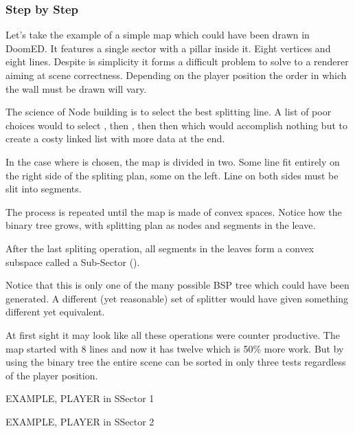 \subsubsection{Step by Step}
Let's take the example of a simple map which could have been drawn in DoomED. It features a single sector with a pillar inside it. Eight vertices and eight lines. Despite is simplicity it forms a difficult problem to solve to a renderer aiming at scene correctness. Depending on the player position the order in which the wall must be drawn will vary. \\
\par
{}
\par
The science of Node building is to select the best splitting line. A list of poor choices would to select , then , then  then  which would accomplish nothing but to create a costy linked list with more data at the end.\\ 
\par
In the case where  is chosen, the map is divided in two. Some line fit entirely on the right side of the spliting plan, some on the left. Line on both sides must be slit into segments.\\
\par
{}
\par
The process is repeated until the map is made of convex spaces. Notice how the binary tree grows, with splitting plan as nodes and segments in the leave. 
\par
{}
\par
After the last spliting operation, all segments in the leaves form a convex subspace called a Sub-Sector ().\\
\par
{}
\par
Notice that this is only one of the many possible BSP tree which could have been generated. A different (yet reasonable) set of splitter would have given something different yet equivalent.\\
\par
{}
\par
At first sight it may look like all these operations were counter productive. The map started with 8 lines and now it has twelve which is 50\% more work. But by using the binary tree the entire scene can be sorted in only three tests regardless of the player position.
\par
EXAMPLE, PLAYER in SSector 1\\
\par
EXAMPLE, PLAYER in SSector 2\\





